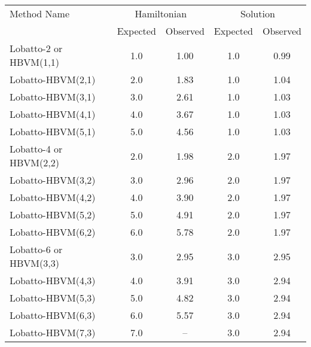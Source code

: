 \begin{tabular}{l|cccc}
\toprule
           Method Name & \multicolumn{2}{c}{Hamiltonian} & \multicolumn{2}{c}{Solution} \\
                       &    Expected & Observed & Expected & Observed \\
\midrule
Lobatto-2 or HBVM(1,1) &         1.0 &     1.00 &      1.0 &     0.99 \\
     Lobatto-HBVM(2,1) &         2.0 &     1.83 &      1.0 &     1.04 \\
     Lobatto-HBVM(3,1) &         3.0 &     2.61 &      1.0 &     1.03 \\
     Lobatto-HBVM(4,1) &         4.0 &     3.67 &      1.0 &     1.03 \\
     Lobatto-HBVM(5,1) &         5.0 &     4.56 &      1.0 &     1.03 \\
Lobatto-4 or HBVM(2,2) &         2.0 &     1.98 &      2.0 &     1.97 \\
     Lobatto-HBVM(3,2) &         3.0 &     2.96 &      2.0 &     1.97 \\
     Lobatto-HBVM(4,2) &         4.0 &     3.90 &      2.0 &     1.97 \\
     Lobatto-HBVM(5,2) &         5.0 &     4.91 &      2.0 &     1.97 \\
     Lobatto-HBVM(6,2) &         6.0 &     5.78 &      2.0 &     1.97 \\
Lobatto-6 or HBVM(3,3) &         3.0 &     2.95 &      3.0 &     2.95 \\
     Lobatto-HBVM(4,3) &         4.0 &     3.91 &      3.0 &     2.94 \\
     Lobatto-HBVM(5,3) &         5.0 &     4.82 &      3.0 &     2.94 \\
     Lobatto-HBVM(6,3) &         6.0 &     5.57 &      3.0 &     2.94 \\
     Lobatto-HBVM(7,3) &         7.0 &       -- &      3.0 &     2.94 \\
\bottomrule
\end{tabular}
